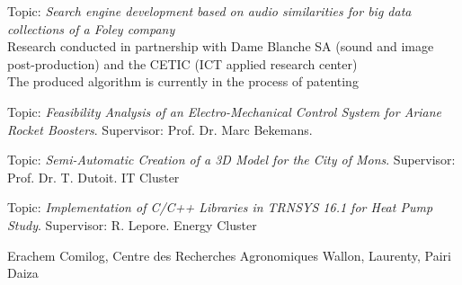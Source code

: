 \documentclass[a4paper]{deedy-resume} %
\begin{document}
\vspace{15pt}

Topic: \textit{Search engine development based on audio similarities for big data collections of a Foley company}\\
Research conducted in partnership with Dame Blanche SA (sound and image post-production) and the CETIC (ICT applied research center)\\
The produced algorithm is currently in the process of patenting

\vspace{15pt}


Topic: \textit{Feasibility Analysis of an Electro-Mechanical Control System for Ariane Rocket Boosters}. Supervisor: Prof. Dr. Marc Bekemans.

\vspace{15pt}

Topic: \textit{Semi-Automatic Creation of a 3D Model for the City of Mons}. Supervisor: Prof. Dr. T. Dutoit. IT Cluster

\vspace{15pt}

Topic: \textit{Implementation of C/C++ Libraries in TRNSYS 16.1 for Heat Pump Study}. Supervisor: R. Lepore. Energy Cluster

\vspace{15pt}

Erachem Comilog, Centre des Recherches Agronomiques Wallon, Laurenty, Pairi Daiza
\end{document}
